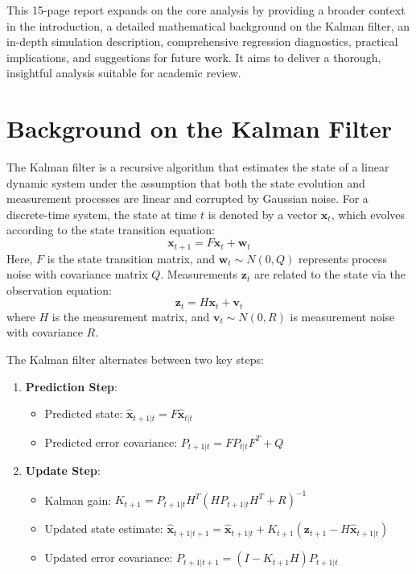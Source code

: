 \documentclass[12pt]{article}
\begin{document}
This 15-page report expands on the core analysis by providing a broader context in the introduction, a detailed mathematical background on the Kalman filter, an in-depth simulation description, comprehensive regression diagnostics, practical implications, and suggestions for future work. It aims to deliver a thorough, insightful analysis suitable for academic review.

\section{Background on the Kalman Filter}
\label{sec:background}

The Kalman filter is a recursive algorithm that estimates the state of a linear dynamic system under the assumption that both the state evolution and measurement processes are linear and corrupted by Gaussian noise. For a discrete-time system, the state at time \( t \) is denoted by a vector \( \mathbf{x}_t \), which evolves according to the state transition equation:
\[
\mathbf{x}_{t+1} = F \mathbf{x}_t + \mathbf{w}_t
\]
Here, \( F \) is the state transition matrix, and \( \mathbf{w}_t \sim N(0, Q) \) represents process noise with covariance matrix \( Q \). Measurements \( \mathbf{z}_t \) are related to the state via the observation equation:
\[
\mathbf{z}_t = H \mathbf{x}_t + \mathbf{v}_t
\]
where \( H \) is the measurement matrix, and \( \mathbf{v}_t \sim N(0, R) \) is measurement noise with covariance \( R \).

The Kalman filter alternates between two key steps:

\begin{enumerate}
    \item \textbf{Prediction Step}:
    \begin{itemize}
        \item Predicted state: \( \hat{\mathbf{x}}_{t+1|t} = F \hat{\mathbf{x}}_{t|t} \)
        \item Predicted error covariance: \( P_{t+1|t} = F P_{t|t} F^T + Q \)
    \end{itemize}
    \item \textbf{Update Step}:
    \begin{itemize}
        \item Kalman gain: \( K_{t+1} = P_{t+1|t} H^T (H P_{t+1|t} H^T + R)^{-1} \)
        \item Updated state estimate: \( \hat{\mathbf{x}}_{t+1|t+1} = \hat{\mathbf{x}}_{t+1|t} + K_{t+1} (\mathbf{z}_{t+1} - H \hat{\mathbf{x}}_{t+1|t}) \)
        \item Updated error covariance: \( P_{t+1|t+1} = (I - K_{t+1} H) P_{t+1|t} \)
    \end{itemize}
\end{enumerate}
\end{document}
